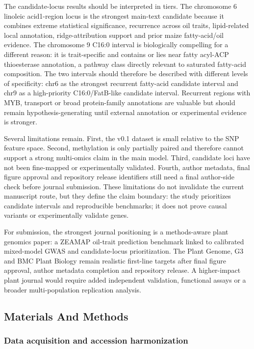 \documentclass[
]{article}
\begin{document}
The candidate-locus results should be interpreted in tiers. The
chromosome 6 linoleic acid1-region locus is the strongest main-text
candidate because it combines extreme statistical significance,
recurrence across oil traits, lipid-related local annotation,
ridge-attribution support and prior maize fatty-acid/oil evidence. The
chromosome 9 C16:0 interval is biologically compelling for a different
reason: it is trait-specific and contains or lies near fatty acyl-ACP
thioesterase annotation, a pathway class directly relevant to saturated
fatty-acid composition. The two intervals should therefore be described
with different levels of specificity: chr6 as the strongest recurrent
fatty-acid candidate interval and chr9 as a high-priority
C16:0/FatB-like candidate interval. Recurrent regions with MYB,
transport or broad protein-family annotations are valuable but should
remain hypothesis-generating until external annotation or experimental
evidence is stronger.

Several limitations remain. First, the v0.1 dataset is small relative to
the SNP feature space. Second, methylation is only partially paired and
therefore cannot support a strong multi-omics claim in the main model.
Third, candidate loci have not been fine-mapped or experimentally
validated. Fourth, author metadata, final figure approval and repository
release identifiers still need a final author-side check before journal
submission. These limitations do not invalidate the current manuscript
route, but they define the claim boundary: the study prioritizes
candidate intervals and reproducible benchmarks; it does not prove
causal variants or experimentally validate genes.

For submission, the strongest journal positioning is a methods-aware
plant genomics paper: a ZEAMAP oil-trait prediction benchmark linked to
calibrated mixed-model GWAS and candidate-locus prioritization. The
Plant Genome, G3 and BMC Plant Biology remain realistic first-line
targets after final figure approval, author metadata completion and
repository release. A higher-impact plant journal would require added
independent validation, functional assays or a broader multi-population
replication analysis.

\subsection{Materials And Methods}\label{materials-and-methods}

\subsubsection{Data acquisition and accession
harmonization}\label{data-acquisition-and-accession-harmonization}
\end{document}
